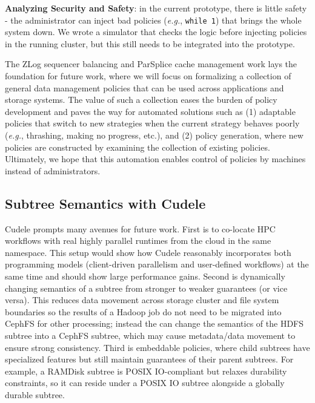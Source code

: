 \textbf{Analyzing Security and Safety}: in the current prototype, there is
little safety - the administrator can inject bad policies ({\it e.g.},
\texttt{while 1}) that brings the whole system down. We wrote a simulator that
checks the logic before injecting policies in the running cluster, but this
still needs to be integrated into the prototype.


The ZLog sequencer balancing and ParSplice cache management work lays the
foundation for future work, where we will focus on formalizing a collection of
general data management policies that can be used across applications and
storage systems.  The value of such a collection eases the burden of policy
development and paves the way for automated solutions such as (1) adaptable
policies that switch to new strategies when the current strategy behaves poorly
({\it e.g.}, thrashing, making no progress, etc.), and (2) policy generation,
where new policies are constructed by examining the collection of existing
policies.  Ultimately, we hope that this automation enables control of policies
by machines instead of administrators. 

\subsection{Subtree Semantics with Cudele}
Cudele prompts many avenues for future work.  First is to co-locate HPC
workflows with real highly parallel runtimes from the cloud in the same
namespace. This setup would show how Cudele reasonably incorporates both programming
models (client-driven parallelism and user-defined workflows) at the same time
and should show large performance gains.  Second is dynamically changing
semantics of a subtree from stronger to weaker guarantees (or vice versa). This
reduces data movement across storage cluster and file system boundaries so
the results of a Hadoop job do not need to be migrated into CephFS for
other processing; instead the  can
change the semantics of the HDFS subtree into a CephFS subtree, which may cause
metadata/data movement to ensure strong consistency. Third is embeddable
policies, where child subtrees have specialized features but still maintain
guarantees of their parent subtrees.  For example, a RAMDisk subtree is POSIX
IO-compliant but relaxes durability constraints, so it can reside under a POSIX
IO subtree alongside a globally durable subtree.

